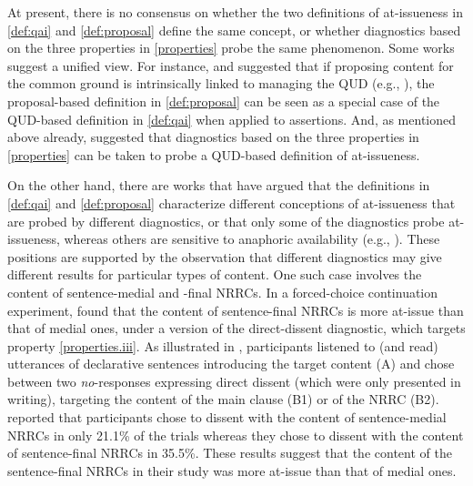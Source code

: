 \documentclass[times,linguex]{glossa}
\begin{document}

At present, there is no consensus on whether the two definitions of at-issueness in \ref{def:qai} and \ref{def:proposal} define the same concept, or whether diagnostics based on the three properties in \ref{properties} probe the same phenomenon. Some works suggest a unified view. For instance, \citet{anderbois_at-issue_2015} and \citet{faller_discourse_2019} suggested that if proposing content for the common ground is intrinsically linked to managing the QUD (e.g., \citealt{farkas_reacting_2010}), the proposal-based definition in \ref{def:proposal} can be seen as a special case of the QUD-based definition in \ref{def:qai} when applied to assertions. And, as mentioned above already, \citet{tonhauser_diagnosing_2012} suggested that diagnostics based on the three properties in \ref{properties} can be taken to probe a QUD-based definition of at-issueness.

On the other hand, there are works that have argued that the definitions in \ref{def:qai} and \ref{def:proposal} characterize different conceptions of at-issueness that are probed by different diagnostics, or that only some of the diagnostics probe at-issueness, whereas others are sensitive to anaphoric availability (e.g., \citealt{snider_anaphoric_2017,koev_notions_2018,korotkova_evidential_2020}). These positions are supported by the observation that different diagnostics may give different results for particular types of content. One such case involves the content of sentence-medial and -final NRRCs. In a forced-choice continuation experiment, \citet{syrett_experimental_2015} found that the content of sentence-final  NRRCs is more at-issue than that of medial ones, under a version of the direct-dissent diagnostic, which targets property \ref{properties.iii}. As illustrated in \Next, participants listened to (and read) utterances of declarative sentences introducing the target content (A) and chose between two \emph{no}-responses expressing direct dissent (which were only presented in writing), targeting the content of the main clause (B1) or of the NRRC (B2). \citet[Exp.~2]{syrett_experimental_2015} reported that participants chose to dissent with the content of sentence-medial NRRCs in only 21.1\% of the trials whereas they chose to dissent with the content of sentence-final NRRCs in 35.5\%. These results suggest that the content of the sentence-final NRRCs in their study was more at-issue than that of medial ones.
\end{document}
